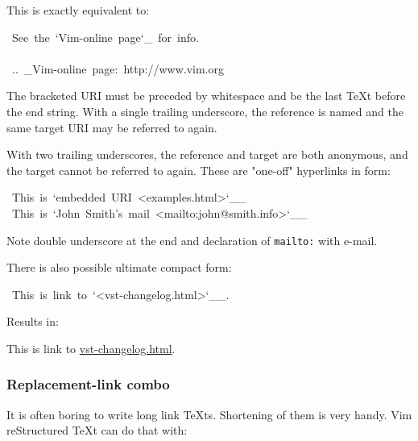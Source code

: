\documentclass[12pt]{article}
\begin{document}
This is exactly equivalent to:

\begin{ttfamily}\begin{flushleft}
\mbox{~See~the~`Vim-online~page`\_~for~info.}\\
\mbox{}\\
\mbox{~..~\_Vim-online~page:~http://www.vim.org}\\
\end{flushleft}\end{ttfamily}

The bracketed URI must be preceded by whitespace and be the last \TeX{}t
before the end string. With a single trailing underscore, the
reference is named and the same target URI may be referred to again.

With two trailing underscores, the reference and target are both
anonymous, and the target cannot be referred to again. These are
"one-off" hyperlinks in form:

\begin{ttfamily}\begin{flushleft}
\mbox{~This~is~`embedded~URI~<examples.html>`\_\_}\\
\mbox{~This~is~`John~Smith's~mail~<mailto:john@smith.info>`\_\_}\\
\end{flushleft}\end{ttfamily}

Note double underscore at the end and declaration of \texttt{mailto:} with e-mail.

There is also possible ultimate compact form:

\begin{ttfamily}\begin{flushleft}
\mbox{~This~is~link~to~`<vst-changelog.html>`\_\_.}\\
\end{flushleft}\end{ttfamily}

Results in:

This is link to \href{vst-changelog.html}{vst-changelog.html}.

\hypertarget{lreplacement-link-combo}{}
\subsubsection{Replacement-link combo}

It is often boring to write long link \TeX{}ts. Shortening of them is very handy.
Vim reStructured \TeX{}t can do that with:
\end{document}
